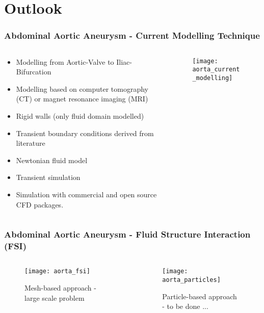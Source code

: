 \section{Outlook}

\begin{frame}
    \frametitle{Abdominal Aortic Aneurysm - Current Modelling Technique}
    \begin{columns}[onlytextwidth]
        \begin{column}{0.5\textwidth}
            \begin{itemize}
                \item Modelling from Aortic-Valve to Iliac-Bifurcation
                \item Modelling based on computer tomography (CT) or magnet resonance imaging (MRI)
                \item Rigid walls (only fluid domain modelled)
                \item Transient boundary conditions derived from literature
                \item Newtonian fluid model
                \item Transient simulation
                \item Simulation with commercial and open source CFD packages.
            \end{itemize}
        \end{column}
        \begin{column}{0.5\textwidth}
            \begin{figure}[ht]
                \centering
                \texttt{[image: aorta\_current\_modelling]}
            \end{figure}
        \end{column}
    \end{columns}
\end{frame}
\begin{frame}
    \frametitle{Abdominal Aortic Aneurysm - Fluid Structure Interaction (FSI)}
    \begin{columns}[onlytextwidth]
        \begin{column}{0.5\textwidth}
            \begin{figure}[ht]
                \centering
                \texttt{[image: aorta\_fsi]}
                \caption{Mesh-based approach - large scale problem}
            \end{figure}
        \end{column}
        \begin{column}{0.5\textwidth}
            \begin{figure}[ht]
                \centering
                \texttt{[image: aorta\_particles]}
                \caption{Particle-based approach - to be done ...}
            \end{figure}
        \end{column}
    \end{columns}
\end{frame}
